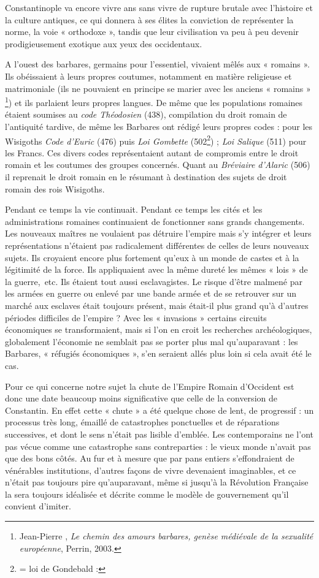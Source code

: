  Constantinople va encore vivre  ans sans vivre de rupture brutale avec l'histoire et la culture antiques, ce qui donnera à ses élites la conviction de représenter la norme, la voie « orthodoxe », tandis que leur civilisation va peu à peu devenir prodigieusement exotique aux yeux des occidentaux.

A l'ouest des barbares, germains pour l'essentiel, vivaient mêlés aux « romains ».  Ils obéissaient à leurs propres coutumes, notamment en matière religieuse et matrimoniale (ils ne pouvaient en principe se marier avec les anciens « romains »
\footnote{Jean-Pierre , \emph{Le chemin des amours barbares, genèse médiévale de la sexualité européenne}, Perrin, 2003.}) et ils parlaient leurs propres langues. De même que les populations romaines étaient soumises au \emph{code Théodosien} (438), compilation du droit romain de l'antiquité tardive, de même les Barbares ont rédigé leurs propres codes : pour les Wisigoths \emph{Code d'Euric} (476) puis \emph{Loi Gombette} (502\footnote{= loi de Gondebald : }) ; \emph{Loi Salique} (511) pour les Francs. Ces divers codes représentaient autant de compromis entre le droit romain et les coutumes des groupes concernés. Quant au \emph{Bréviaire d'Alaric} (506) il reprenait le droit romain en le résumant à destination des sujets de droit romain des rois Wisigoths.

 Pendant ce temps la vie continuait. Pendant ce temps les cités et les administrations romaines continuaient de fonctionner sans grands changements. Les nouveaux maîtres ne voulaient pas détruire l'empire mais s'y intégrer et leurs représentations n'étaient pas radicalement différentes de celles de leurs nouveaux sujets. Ils croyaient encore plus fortement qu'eux à un monde de castes et à la légitimité de la force. Ils appliquaient avec la même dureté les mêmes « lois » de la guerre,~etc. Ils étaient tout aussi esclavagistes. Le risque d'être malmené par les armées en guerre ou enlevé par une bande armée et de se retrouver sur un marché aux esclaves était toujours présent, mais était-il plus grand qu'à d'autres périodes difficiles de l'empire ? Avec les « invasions » certains circuits économiques se transformaient, mais si l'on en croit les recherches archéologiques, globalement l'économie ne semblait pas se porter plus mal qu'auparavant : les Barbares, « réfugiés économiques », s'en seraient allés plus loin si cela avait été le cas.

 Pour ce qui concerne notre sujet la chute de l'Empire Romain d'Occident est donc une date beaucoup moins significative que celle de la conversion de Constantin. En effet cette « chute » a été quelque chose de lent, de progressif : un processus très long, émaillé de catastrophes ponctuelles et de réparations successives, et dont le sens n'était pas lisible d'emblée. Les contemporains ne l'ont pas vécue comme une catastrophe sans contreparties : le vieux monde n'avait pas que des bons côtés. Au fur et à mesure que par pans entiers s'effondraient de vénérables institutions, d'autres façons de vivre devenaient imaginables, et ce n'était pas toujours pire qu'auparavant, même si jusqu'à la Révolution Française la  sera toujours idéalisée et décrite comme le modèle de gouvernement qu'il convient d'imiter. 

